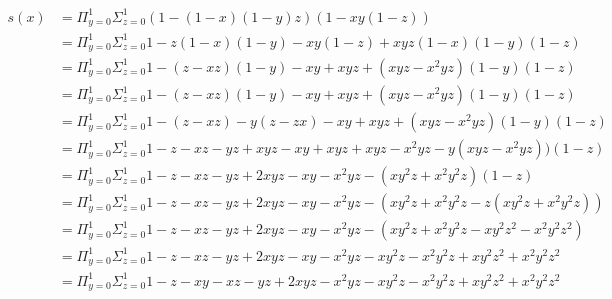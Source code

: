 \documentclass[letterpaper,notitlepage,twoside]{article}
\begin{document}
\begin{align*}
s(x) &= \Pi_{y = 0}^1\Sigma_{z = 0}^1 (1 - (1 - x)(1 - y)z)(1 - xy(1 - z)) \\
     &= \Pi_{y = 0}^1\Sigma_{z = 0}^1 1 - z(1 - x)(1 - y) - xy(1 - z) + xyz(1 - x)(1 - y)(1 - z) \\
     &= \Pi_{y = 0}^1\Sigma_{z = 0}^1 1 - (z - xz)(1 - y) - xy + xyz + (xyz - x^2yz)(1 - y)(1 - z) \\
     &= \Pi_{y = 0}^1\Sigma_{z = 0}^1 1 - (z - xz)(1 - y) - xy + xyz + (xyz - x^2yz)(1 - y)(1 - z) \\
     &= \Pi_{y = 0}^1\Sigma_{z = 0}^1 1 - (z - xz) - y(z - zx) - xy + xyz + (xyz - x^2yz)(1 - y)(1 - z) \\
     &= \Pi_{y = 0}^1\Sigma_{z = 0}^1 1 - z - xz - yz + xyz - xy + xyz + xyz - x^2yz - y(xyz - x^2yz))(1 - z) \\
     &= \Pi_{y = 0}^1\Sigma_{z = 0}^1 1 - z - xz - yz + 2xyz - xy - x^2yz - (xy^2z + x^2y^2z)(1 - z) \\
     &= \Pi_{y = 0}^1\Sigma_{z = 0}^1 1 - z - xz - yz + 2xyz - xy - x^2yz - (xy^2z + x^2y^2z - z(xy^2z + x^2y^2z)) \\
     &= \Pi_{y = 0}^1\Sigma_{z = 0}^1 1 - z - xz - yz + 2xyz - xy - x^2yz - (xy^2z + x^2y^2z - xy^2z^2 - x^2y^2z^2) \\
     &= \Pi_{y = 0}^1\Sigma_{z = 0}^1 1 - z - xz - yz + 2xyz - xy - x^2yz - xy^2z - x^2y^2z + xy^2z^2 + x^2y^2z^2 \\
     &= \Pi_{y = 0}^1\Sigma_{z = 0}^1 1 - z - xy - xz - yz + 2xyz - x^2yz - xy^2z - x^2y^2z + xy^2z^2 + x^2y^2z^2 \\
\end{align*}
\end{document}

